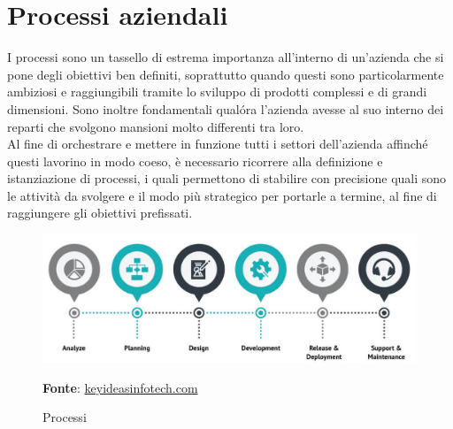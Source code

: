 \section{Processi aziendali}
    I processi sono un tassello di estrema importanza all'interno di un'azienda che si pone degli obiettivi ben definiti, soprattutto quando questi sono particolarmente ambiziosi e raggiungibili tramite lo sviluppo di prodotti complessi e di grandi dimensioni. Sono inoltre fondamentali qual\'{o}ra l'azienda avesse al suo interno dei reparti che svolgono mansioni molto differenti tra loro. \\
    Al fine di orchestrare e mettere in funzione tutti i settori dell'azienda affinché questi lavorino in modo coeso, è necessario ricorrere alla definizione e istanziazione di processi, i quali permettono di stabilire con precisione quali sono le attività da svolgere e il modo più strategico per portarle a termine, al fine di raggiungere gli obiettivi prefissati.
    
    \begin{figure}[h]
        \centering
        \includegraphics[width=1\textwidth]{immagini/process.jpg}
        \caption{Processi}
        \textbf{Fonte}: \href{https://www.keyideasinfotech.com/wp-content/uploads/blog/Web-and-e-commerce-software-development-processes.jpg}{keyideasinfotech.com}
        \label{fig: Processi}
    \end{figure}
    
